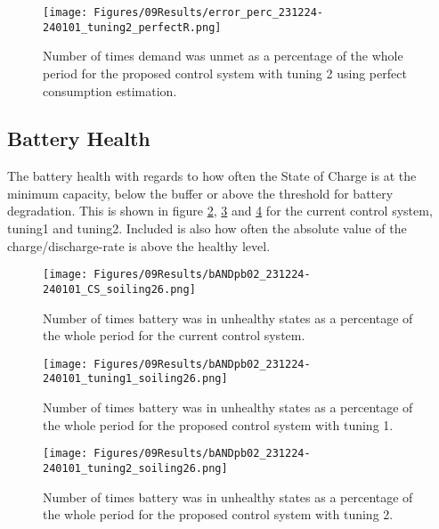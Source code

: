 \begin{figure}[h]
    \centering
    \texttt{[image: Figures/09Results/error\_perc\_231224-240101\_tuning2\_perfectR.png]}
    \caption[Unmet demand portion proposed control system 2 perfect R]{Number of times demand was unmet as a percentage of the whole period for the proposed control system with tuning 2 using perfect consumption estimation. }
    \label{fig:error_perc_231224-240101_tuning2_perfectR}
\end{figure}

\subsection{Battery Health}

The battery health with regards to how often the State of Charge is at the minimum capacity, below the buffer or above the threshold for battery degradation. This is shown in figure \ref{fig:bANDpb02_231224-240101_CS_soiling26}, \ref{fig:bANDpb02_231224-240101_tuning1_soiling26} and \ref{fig:bANDpb02_231224-240101_tuning2_soiling26} for the current control system, tuning1 and tuning2. Included is also how often the absolute value of the charge/discharge-rate is above the healthy level. 

\begin{figure}[h]
    \centering
    \texttt{[image: Figures/09Results/bANDpb02\_231224-240101\_CS\_soiling26.png]}
    \caption[Battery results current control system]{Number of times battery was in unhealthy states as a percentage of the whole period for the current control system. }
    \label{fig:bANDpb02_231224-240101_CS_soiling26}
\end{figure}


\begin{figure}[h]
    \centering
    \texttt{[image: Figures/09Results/bANDpb02\_231224-240101\_tuning1\_soiling26.png]}
    \caption[Battery results proposed control system 1]{Number of times battery was in unhealthy states as a percentage of the whole period for the proposed control system with tuning 1. }
    \label{fig:bANDpb02_231224-240101_tuning1_soiling26}
\end{figure}

\begin{figure}[h]
    \centering
    \texttt{[image: Figures/09Results/bANDpb02\_231224-240101\_tuning2\_soiling26.png]}
    \caption[Battery results proposed control system 2]{Number of times battery was in unhealthy states as a percentage of the whole period for the proposed control system with tuning 2. }
    \label{fig:bANDpb02_231224-240101_tuning2_soiling26}
\end{figure}

